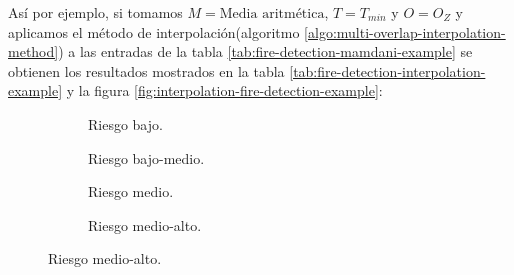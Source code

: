 Así por ejemplo, si tomamos $M = \text{Media aritmética}$, $T = T_{min}$ y $O = O_Z$ y aplicamos el método de interpolación(algoritmo \ref{algo:multi-overlap-interpolation-method}) a las entradas de la tabla \ref{tab:fire-detection-mamdani-example} se obtienen los resultados mostrados en la tabla \ref{tab:fire-detection-interpolation-example} y la figura \ref{fig:interpolation-fire-detection-example}:

\begin{center}
    
\end{center}

\begin{figure}[t]
	\centering
	\begin{subfigure}[b]{0.45\textwidth}
		\setlength\figureheight{3cm}
		\setlength\figurewidth{6cm}
		
		\caption{Riesgo bajo.}\label{fig:fire-detection-interpolation-low}
	\end{subfigure}
	\qquad
	\begin{subfigure}[b]{0.45\textwidth}
		\setlength\figureheight{3cm}
		\setlength\figurewidth{6cm}
		
		\caption{Riesgo bajo-medio.}\label{fig:fire-detection-interpolation-low-medium}
	\end{subfigure}
	
	\vspace{1cm}
	\begin{subfigure}[b]{0.45\textwidth}
		\setlength\figureheight{3cm}
		\setlength\figurewidth{6cm}
		
		\caption{Riesgo medio.}\label{fig:fire-detection-interpolation-medium}
	\end{subfigure}
	\qquad
	\begin{subfigure}[b]{0.45\textwidth}
		\setlength\figureheight{3cm}
		\setlength\figurewidth{6cm}
		
		\caption{Riesgo medio-alto.}\label{fig:fire-detection-interpolation-medium-high}
	\end{subfigure}
	

\end{figure}
